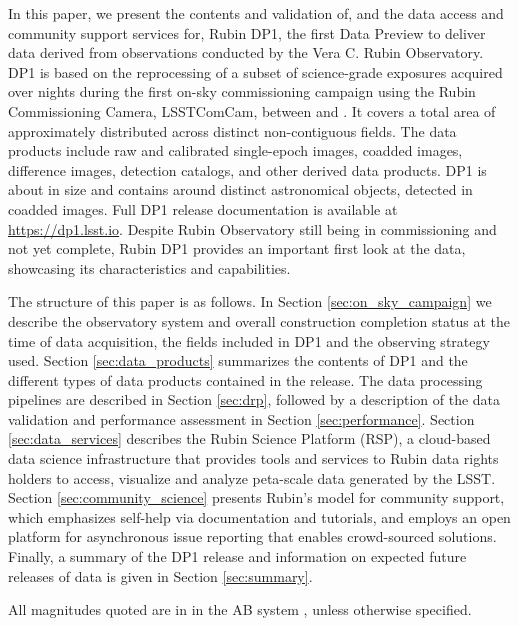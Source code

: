 In this paper, we present the contents and validation of, and the data access and community support services for, Rubin \gls{DP1}, the first Data Preview to deliver data derived from observations conducted by the Vera C. Rubin Observatory.
DP1 is based on the reprocessing of a subset of \nexposures science-grade exposures acquired over \nnightscomcam nights during the first on-sky commissioning campaign using the Rubin Commissioning \gls{Camera}, \gls{LSSTComCam}, between \dponestartdate and \dponeenddate.
It covers a  total area of approximately \totalarea distributed across \nfields distinct non-contiguous fields.
The data products include raw and calibrated single-epoch images, coadded images, difference images, detection catalogs, and other derived data products.
DP1 is about \sizeinbytes in size and contains around \nobjects distinct astronomical objects, detected in \ndeepcoadds coadded images.
Full \gls{DP1} release documentation is available at \url{https://dp1.lsst.io}.
Despite Rubin Observatory still being in commissioning and not yet complete, Rubin \gls{DP1} provides an important first look at the data, showcasing its characteristics and capabilities.

The structure of this paper is as follows.
In Section \ref{sec:on_sky_campaign} we describe the observatory system and overall construction completion status at the time of data acquisition, the \nfields fields included in \gls{DP1} and the observing strategy used.
Section \ref{sec:data_products} summarizes the contents of \gls{DP1} and the different types of data products contained in the release.
The data processing pipelines are described in Section \ref{sec:drp}, followed by a description of the data validation and performance assessment in Section \ref{sec:performance}.
Section \ref{sec:data_services} describes the Rubin \gls{Science Platform} (RSP), a \gls{cloud}-based data science infrastructure that provides tools and services to Rubin data rights holders to access, visualize and analyze peta-scale data generated by the LSST.
Section \ref{sec:community_science} presents Rubin’s model for community support, which emphasizes self-help via documentation and tutorials, and employs an open platform for asynchronous issue reporting that enables crowd-sourced solutions.
Finally, a summary of the \gls{DP1} release and information on expected future releases of data is given in Section \ref{sec:summary}.

All magnitudes quoted are in
in the AB system \citep{1983ApJ...266..713O}, unless otherwise specified.
